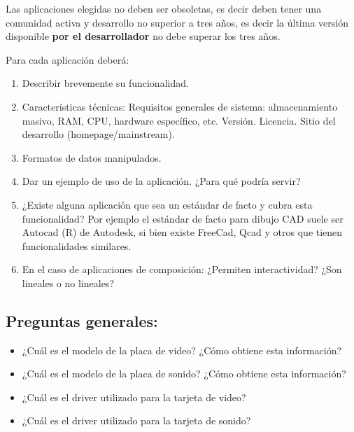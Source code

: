 \documentclass[12pt]{article}
\begin{document}
Las aplicaciones elegidas no deben ser obsoletas, es decir deben
tener una comunidad activa y desarrollo no superior a tres años, 
es decir la última versión disponible {\bf por el desarrollador}
no debe superar los tres años. 

Para cada aplicación deberá:
\begin{enumerate}
\item Describir brevemente su funcionalidad. 
\item Características técnicas: Requisitos generales 
de sistema: almacenamiento masivo, RAM, CPU, hardware específico, etc. 
Versión. Licencia. Sitio del desarrollo (homepage/mainstream). 
\item Formatos de datos manipulados. 
\item Dar un ejemplo de uso de la aplicación. ¿Para qué podría servir? 
\item ¿Existe alguna aplicación que sea un estándar de facto y cubra esta
funcionalidad? Por ejemplo el estándar de facto para dibujo CAD suele ser
Autocad (R) de Autodesk, si bien existe FreeCad, Qcad y otros que tienen
funcionalidades similares. 
\item En el caso de aplicaciones de composición: ¿Permiten interactividad? 
¿Son lineales o no lineales? 
\end{enumerate}

\subsection*{Preguntas generales:}
\begin{itemize}
\item ¿Cuál es el modelo de la placa de video? ¿Cómo obtiene esta información?
\item ¿Cuál es el modelo de la placa de sonido? ¿Cómo obtiene esta información?
\item ¿Cuál es el driver utilizado para la tarjeta de video?
\item ¿Cuál es el driver utilizado para la tarjeta de sonido?
\end{itemize}
\end{document}
